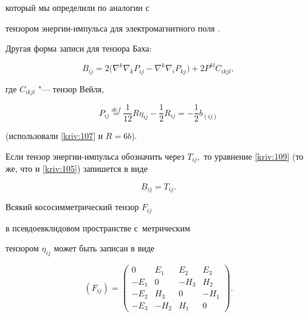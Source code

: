 который мы определили по аналогии с 

тензором энергии-импульса для электромагнитного поля \cite[формула 33,1]{bib:kriv:6}. 

Другая  форма записи для тензора Баха:

\begin{equation}

B_{ij}=2\bigl( \nabla ^{k}\nabla _{k}P_{ij}-\nabla ^{k}\nabla _{i}P_{kj}\bigr) +2P^{kl}C_{ikjl},  \label{kriv:110}

\end{equation}

где $C_{ikjl}$ "--- тензор Вейля, 

\begin{equation}

P_{ij}\overset{def}{=}\frac{1}{12}R\eta _{ij}-\frac{1}{2}R_{ij}=-\frac{1}{2}b_{\left( ij\right) }  \label{kriv:112}

\end{equation}

(использовали \eqref{kriv:107} и $R=6b$). 

Если  тензор энергии-импульса обозначить через $T_{ij},$ то уравнение \eqref{kriv:109} (то же, что и \eqref{kriv:105}) запишется в виде 

\begin{equation}

B_{ij}=T_{ij}.  \label{kriv:111}

\end{equation}



\smallskip




Всякий кососимметрический тензор $F_{ij}$ 

в псевдоевклидовом пространстве с~метрическим

тензором $\eta _{ij}$ может быть записан в виде

\begin{equation}

\left( F_{ij}\right) =\left( 

\begin{array}{cccc}

0 & E_{1} & E_{2} & E_{3} \\ 

-E_{1} & 0 & -H_{3} & H_{2} \\ 

-E_{2} & H_{3} & 0 & -H_{1} \\ 

-E_{3} & -H_{2} & H_{1} & 0\end{array}\right) .  \label{kriv:201}

\end{equation}


